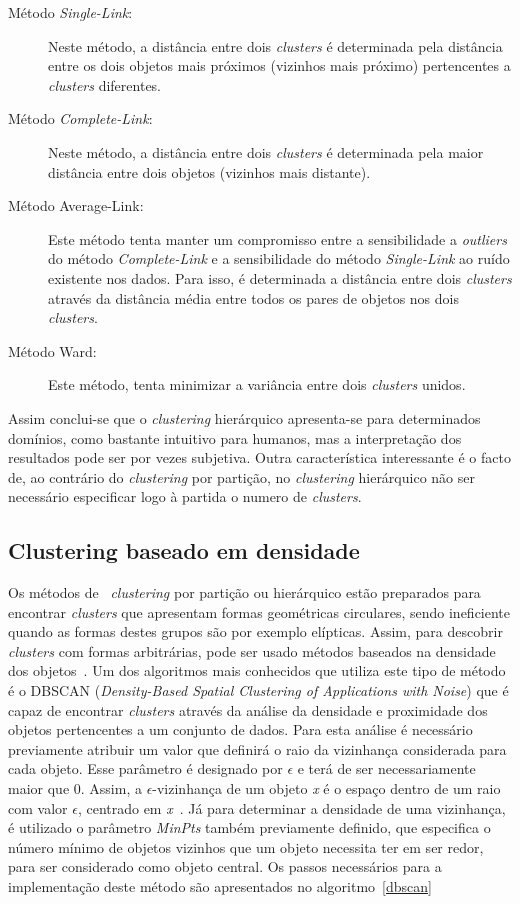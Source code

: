 \begin{description}
\item[Método \textit{Single-Link}:] Neste método, a distância entre dois \textit{clusters} é determinada pela distância entre os dois objetos mais próximos (vizinhos mais próximo) pertencentes a \textit{clusters} diferentes.
\item[Método \textit{Complete-Link}:] Neste método, a distância entre dois \textit{clusters} é determinada pela maior distância entre dois objetos (vizinhos mais distante).
\item[Método Average-Link:] Este método tenta manter um compromisso entre a sensibilidade a \textit{outliers} do método \textit{Complete-Link} e a sensibilidade do método \textit{Single-Link} ao ruído existente nos dados. Para isso, é determinada a distância entre dois \textit{clusters} através da distância média entre todos os pares de objetos nos dois \textit{clusters}.
\item[Método Ward:] Este método, tenta minimizar a variância entre dois \textit{clusters} unidos.
\end{description}

Assim conclui-se que o \textit{clustering} hierárquico apresenta-se para determinados domínios, como bastante intuitivo para humanos, mas a interpretação dos resultados pode ser por vezes subjetiva. Outra característica interessante é o facto de, ao contrário do \textit{clustering} por partição, no \textit{clustering} hierárquico não ser necessário especificar logo à partida o numero de \textit{clusters}. 

\subsection{Clustering baseado em densidade} 

Os métodos de ~\textit{clustering} por partição ou hierárquico estão preparados para encontrar \textit{clusters} que apresentam formas geométricas circulares, sendo ineficiente quando as formas destes grupos são por exemplo elípticas. Assim, para descobrir \textit{clusters} com formas arbitrárias, pode ser usado métodos baseados na densidade dos objetos~\cite{Han2006}. Um dos algoritmos mais conhecidos que utiliza este tipo de método é o DBSCAN (\textit{Density-Based Spatial Clustering of Applications with Noise}) que é capaz de encontrar \textit{clusters} através da análise da densidade e proximidade dos objetos pertencentes a um conjunto de dados. Para esta análise é necessário previamente atribuir um valor que definirá o raio da vizinhança considerada para cada objeto. Esse parâmetro é designado por $ \epsilon $ e terá de ser necessariamente maior que 0. Assim,  a $ \epsilon $-vizinhança de um objeto \textit{x} é o espaço dentro de um raio com valor $ \epsilon $, centrado em \textit{x}~\cite{Han2006}. Já para determinar a densidade de uma vizinhança, é utilizado o parâmetro \textit{MinPts} também previamente definido, que especifica o número mínimo de objetos vizinhos que um objeto necessita ter em ser redor, para ser considerado como objeto central.
Os passos necessários para a implementação deste método são apresentados no algoritmo~\ref{dbscan}

